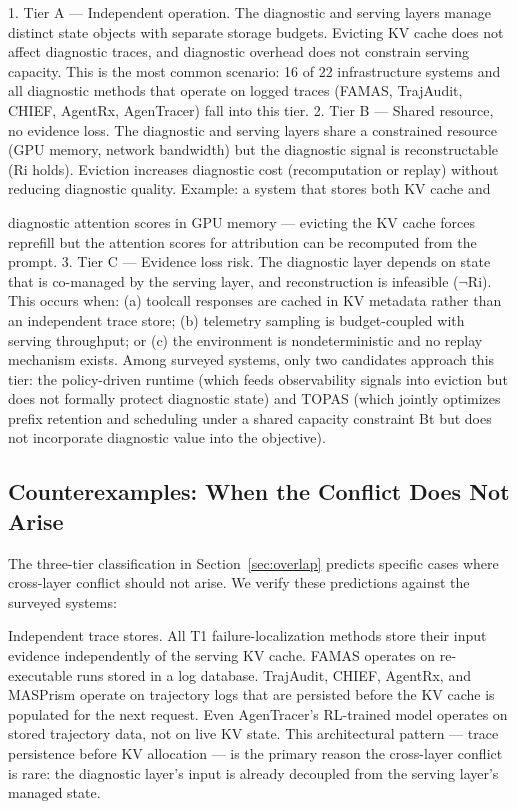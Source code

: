 \documentclass[preprint,12pt]{elsarticle}
\begin{document}
1. Tier A --- Independent operation. The diagnostic and serving layers manage distinct state objects with separate storage budgets. Evicting KV cache does not affect diagnostic traces, and diagnostic overhead does not constrain serving capacity. This is the most common scenario: 16 of 22 infrastructure systems and all diagnostic methods that operate on logged traces (FAMAS, TrajAudit, CHIEF, AgentRx, AgenTracer) fall into this tier. 2. Tier B --- Shared resource, no evidence loss. The diagnostic and serving layers share a constrained resource (GPU memory, network bandwidth) but the diagnostic signal is reconstructable (Ri holds). Eviction increases diagnostic cost (recomputation or replay) without reducing diagnostic quality. Example: a system that stores both KV cache and


diagnostic attention scores in GPU memory --- evicting the KV cache forces reprefill but the attention scores for attribution can be recomputed from the prompt. 3. Tier C --- Evidence loss risk. The diagnostic layer depends on state that is co-managed by the serving layer, and reconstruction is infeasible ($\neg$Ri). This occurs when: (a) toolcall responses are cached in KV metadata rather than an independent trace store; (b) telemetry sampling is budget-coupled with serving throughput; or (c) the environment is nondeterministic and no replay mechanism exists. Among surveyed systems, only two candidates approach this tier: the policy-driven runtime (which feeds observability signals into eviction but does not formally protect diagnostic state) and TOPAS (which jointly optimizes prefix retention and scheduling under a shared capacity constraint Bt but does not incorporate diagnostic value into the objective).


\subsection{Counterexamples: When the Conflict Does Not Arise}
The three-tier classification in Section~\ref{sec:overlap} predicts specific cases where cross-layer conflict should not arise. We verify these predictions against the surveyed systems:


Independent trace stores. All T1 failure-localization methods store their input evidence independently of the serving KV cache. FAMAS operates on re-executable runs stored in a log database. TrajAudit, CHIEF, AgentRx, and MASPrism operate on trajectory logs that are persisted before the KV cache is populated for the next request. Even AgenTracer's RL-trained model operates on stored trajectory data, not on live KV state. This architectural pattern --- trace persistence before KV allocation --- is the primary reason the cross-layer conflict is rare: the diagnostic layer's input is already decoupled from the serving layer's managed state.
\end{document}
